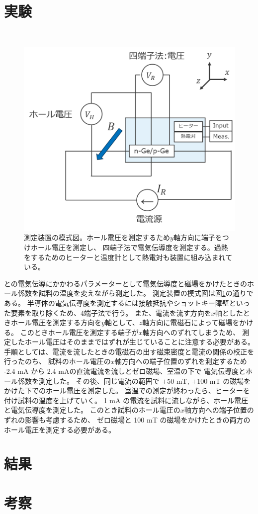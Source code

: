 \documentclass[11pt,dvipdfmx,a4paper]{jsarticle}
\numberwithin{equation}{section}
\begin{document}
\section{実験}
　　　　　　　　　　　　　　　　　　　　　　　　　　　　　　　　　
\begin{figure}
	\centering
	\includegraphics[width=0.4\columnwidth]{fig/fig02.png}
	\caption{測定装置の模式図。ホール電圧を測定するため\(y\)軸方向に端子をつけホール電圧を測定し、
	四端子法で電気伝導度を測定する。過熱をするためのヒーターと温度計として熱電対も装置に組み込まれている。}
	\label{fig:02}
\end{figure}
との電気伝導にかかわるパラメーターとして電気伝導度と磁場をかけたときのホール係数を試料の温度を変えながら測定した。
測定装置の模式図は図\ref{fig:02}の通りである。
半導体の電気伝導度を測定するには接触抵抗やショットキー障壁といった要素を取り除くため、4端子法で行う。
また、電流を流す方向を\(x\)軸としたときホール電圧を測定する方向を\(y\)軸として、\(z\)軸方向に電磁石によって磁場をかける。
このときホール電圧を測定する端子が\(x\)軸方向へのずれてしまうため、
測定したホール電圧はそのままではずれが生じていることに注意する必要がある。
手順としては、電流を流したときの電磁石の出す磁束密度と電流の関係の校正を行ったのち、
試料のホール電圧の\(x\)軸方向への端子位置のずれを測定するため
-2.4 mA から 2.4 mAの直流電流を流しとゼロ磁場、室温の下で
電気伝導度とホール係数を測定した。
その後、同じ電流の範囲で \(\pm\)50 mT, \(\pm\)100 mT の磁場をかけた下でのホール電圧を測定した。
室温での測定が終わったら、ヒーターを付け試料の温度を上げていく。
1 mA の電流を試料に流しながら、ホール電圧と電気伝導度を測定した。
このとき試料のホール電圧の\(x\)軸方向への端子位置のずれの影響も考慮するため、
ゼロ磁場と 100 mT の磁場をかけたときの両方のホール電圧を測定する必要がある。

\section{結果}

\clearpage
\section{考察}
\end{document}
